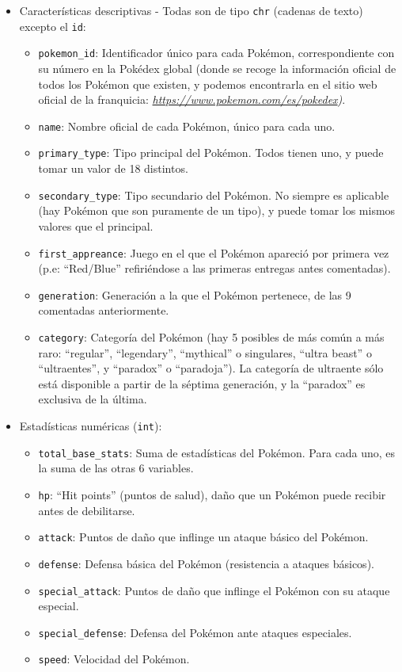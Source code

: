 \documentclass[
  11.8pt,
]{extreport}
\begin{document}
\begin{itemize}
\item
  Características descriptivas - Todas son de tipo \texttt{chr} (cadenas
  de texto) excepto el \texttt{id}:

  \begin{itemize}
  \item
    \texttt{pokemon\_id}: Identificador único para cada Pokémon,
    correspondiente con su número en la Pokédex global (donde se recoge
    la información oficial de todos los Pokémon que existen, y podemos
    encontrarla en el sitio web oficial de la franquicia:
    \href{https://www.pokemon.com/es/pokedex}{\emph{https://www.pokemon.com/es/pokedex}}\emph{)}.
  \item
    \texttt{name}: Nombre oficial de cada Pokémon, único para cada uno.
  \item
    \texttt{primary\_type}: Tipo principal del Pokémon. Todos tienen
    uno, y puede tomar un valor de 18 distintos.
  \item
    \texttt{secondary\_type}: Tipo secundario del Pokémon. No siempre es
    aplicable (hay Pokémon que son puramente de un tipo), y puede tomar
    los mismos valores que el principal.
  \item
    \texttt{first\_appreance}: Juego en el que el Pokémon apareció por
    primera vez (p.e: ``Red/Blue'' refiriéndose a las primeras entregas
    antes comentadas).
  \item
    \texttt{generation}: Generación a la que el Pokémon pertenece, de
    las 9 comentadas anteriormente.
  \item
    \texttt{category}: Categoría del Pokémon (hay 5 posibles de más
    común a más raro: ``regular'', ``legendary'', ``mythical'' o
    singulares, ``ultra beast'' o ``ultraentes'', y ``paradox'' o
    ``paradoja''). La categoría de ultraente sólo está disponible a
    partir de la séptima generación, y la ``paradox'' es exclusiva de la
    última.
  \end{itemize}
\item
  Estadísticas numéricas (\texttt{int}):

  \begin{itemize}
  \item
    \texttt{total\_base\_stats}: Suma de estadísticas del Pokémon. Para
    cada uno, es la suma de las otras 6 variables.
  \item
    \texttt{hp}: ``Hit points'' (puntos de salud), daño que un Pokémon
    puede recibir antes de debilitarse.
  \item
    \texttt{attack}: Puntos de daño que inflinge un ataque básico del
    Pokémon.
  \item
    \texttt{defense}: Defensa básica del Pokémon (resistencia a ataques
    básicos).
  \item
    \texttt{special\_attack}: Puntos de daño que inflinge el Pokémon con
    su ataque especial.
  \item
    \texttt{special\_defense}: Defensa del Pokémon ante ataques
    especiales.
  \item
    \texttt{speed}: Velocidad del Pokémon.
  \end{itemize}
\end{itemize}
\end{document}
